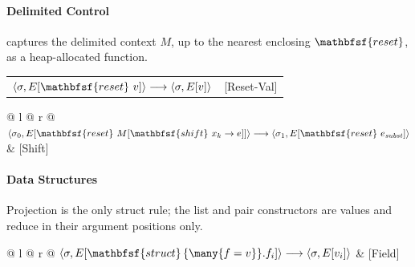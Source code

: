 \paragraph{Delimited Control}
 captures the delimited context $M$, up to the nearest enclosing $\mathbfsf{reset}$, as a heap-allocated function.

\noindent
\begin{tabular*}{\linewidth}{@{} l @{\extracolsep{\fill}} r @{}}
$\langle \sigma, E[\mathbfsf{reset}\ v] \rangle \longrightarrow \langle \sigma, E[v] \rangle$ & [Reset-Val]
\end{tabular*}\vspace{1em}

\noindent
\begin{tabular*}{\linewidth}{@{} l @{\extracolsep{\fill}} r @{}}
$\langle \sigma_0, E[\mathbfsf{reset}\ M[\mathbfsf{shift}\ x_k \to e]] \rangle \longrightarrow \langle \sigma_1, E[\mathbfsf{reset}\ e_{\mathit{subst}}] \rangle$ & [Shift] \\
\end{tabular*}
\vspace{1em}
\paragraph{Data Structures}
Projection is the only struct rule; the list and pair constructors are values and reduce in their argument positions only.

\noindent
\begin{tabular*}{\linewidth}{@{} l @{\extracolsep{\fill}} r @{}}
$\langle \sigma, E[\mathbfsf{struct}\,\{\many{f = v}\}.f_i] \rangle \longrightarrow \langle \sigma, E[v_i] \rangle$ & [Field] \\
\end{tabular*}\vspace{1em}

